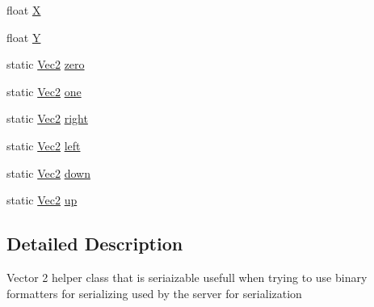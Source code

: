 \begin{DoxyCompactItemize}
\item 
float \mbox{\hyperlink{class_virt_muse_web_1_1_utility_1_1_vec2_a593033a652385845ed88ec14541754ce}{X}}
\item 
float \mbox{\hyperlink{class_virt_muse_web_1_1_utility_1_1_vec2_a36fa9a504dc5209a043170b2ef693f18}{Y}}
\item 
static \mbox{\hyperlink{class_virt_muse_web_1_1_utility_1_1_vec2}{Vec2}} \mbox{\hyperlink{class_virt_muse_web_1_1_utility_1_1_vec2_a556e3d279f0c41b1627e63d10ec9d86d}{zero}}
\item 
static \mbox{\hyperlink{class_virt_muse_web_1_1_utility_1_1_vec2}{Vec2}} \mbox{\hyperlink{class_virt_muse_web_1_1_utility_1_1_vec2_a6af7b423aa9ab33efd4184f0a8ef9132}{one}}
\item 
static \mbox{\hyperlink{class_virt_muse_web_1_1_utility_1_1_vec2}{Vec2}} \mbox{\hyperlink{class_virt_muse_web_1_1_utility_1_1_vec2_ace4b0b7f54d2b12e73811b8dda6533f6}{right}}
\item 
static \mbox{\hyperlink{class_virt_muse_web_1_1_utility_1_1_vec2}{Vec2}} \mbox{\hyperlink{class_virt_muse_web_1_1_utility_1_1_vec2_a55a8d17525fcb7c5c40d42db064cf360}{left}}
\item 
static \mbox{\hyperlink{class_virt_muse_web_1_1_utility_1_1_vec2}{Vec2}} \mbox{\hyperlink{class_virt_muse_web_1_1_utility_1_1_vec2_ac876086c80c0440f9b3b2dceb5d0bdfc}{down}}
\item 
static \mbox{\hyperlink{class_virt_muse_web_1_1_utility_1_1_vec2}{Vec2}} \mbox{\hyperlink{class_virt_muse_web_1_1_utility_1_1_vec2_a4abde1e61a9dc434e5c33c88a2090229}{up}}
\end{DoxyCompactItemize}


\subsection{Detailed Description}
Vector 2 helper class that is seriaizable usefull when trying to use binary formatters for serializing used by the server for serialization 



